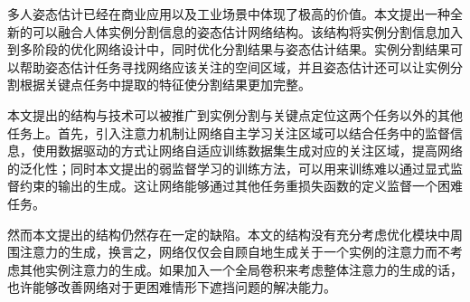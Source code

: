 \begin{conclusion}
多人姿态估计已经在商业应用以及工业场景中体现了极高的价值。本文提出一种全新的可以融合人体实例分割信息的姿态估计网络结构。该结构将实例分割信息加入到多阶段的优化网络设计中，同时优化分割结果与姿态估计结果。实例分割结果可以帮助姿态估计任务寻找网络应该关注的空间区域，并且姿态估计还可以让实例分割根据关键点任务中提取的特征使分割结果更加完整。

本文提出的结构与技术可以被推广到实例分割与关键点定位这两个任务以外的其他任务上。首先，引入注意力机制让网络自主学习关注区域可以结合任务中的监督信息，使用数据驱动的方式让网络自适应训练数据集生成对应的关注区域，提高网络的泛化性；同时本文提出的弱监督学习的训练方法，可以用来训练难以通过显式监督约束的输出的生成。这让网络能够通过其他任务重损失函数的定义监督一个困难任务。

然而本文提出的结构仍然存在一定的缺陷。本文的结构没有充分考虑优化模块中周围注意力的生成，换言之，网络仅仅会自顾自地生成关于一个实例的注意力而不考虑其他实例注意力的生成。如果加入一个全局卷积来考虑整体注意力的生成的话，也许能够改善网络对于更困难情形下遮挡问题的解决能力。

\end{conclusion}